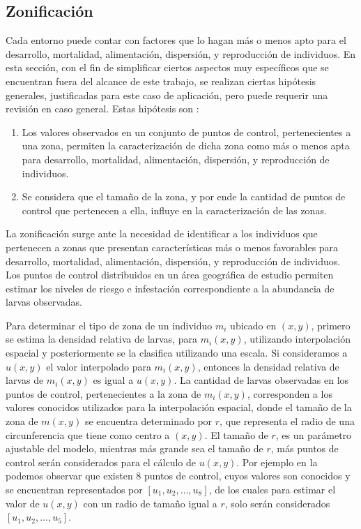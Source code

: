 \subsection{Zonificación}
\label{subsec:cap4-zonificacion}
Cada entorno puede contar con factores que lo hagan más o menos apto para el desarrollo,
mortalidad, alimentación, dispersión, y reproducción de individuos. En esta sección, con el fin de
simplificar ciertos aspectos muy específicos que se encuentran fuera del alcance de este trabajo,
se realizan ciertas hipótesis generales, justificadas para este caso de aplicación, pero puede
requerir una revisión en caso general. Estas hipótesis son :
\begin{enumerate}
    \item Los valores observados en un conjunto de puntos de control, pertenecientes a una zona, permiten la caracterización de dicha zona como más o menos apta para desarrollo, mortalidad, alimentación, dispersión, y reproducción de individuos.
    \item Se considera que el tamaño de la zona, y por ende la cantidad de puntos de control que pertenecen a ella, influye en la caracterización de las zonas.
\end{enumerate}

La zonificación surge ante la necesidad de identificar a los individuos que pertenecen a zonas que
presentan características más o menos favorables para desarrollo, mortalidad, alimentación,
dispersión, y reproducción de individuos. Los puntos de control distribuidos en un área geográfica
de estudio permiten estimar los niveles de riesgo e infestación correspondiente a la abundancia de
larvas observadas.

Para determinar el tipo de zona de un individuo $m_{i}$ ubicado en $(x, y)$, primero se estima la
densidad relativa de larvas, para $m_{i}(x, y)$, utilizando interpolación espacial y posteriormente
se la clasifica utilizando una escala. Si consideramos a $u(x, y)$ el valor interpolado para
$m_{i}(x, y)$, entonces la densidad relativa de larvas de $m_{i}(x, y)$ es igual a $u(x, y)$. La
cantidad de larvas observadas en los puntos de control, pertenecientes a la zona de $m_{i}(x, y)$,
corresponden a los valores conocidos utilizados para la interpolación espacial, donde el tamaño de
la zona de $m(x, y)$ se encuentra determinado por $r$, que representa el radio de una
circunferencia que tiene como centro a $(x, y)$. El tamaño de $r$, es un parámetro ajustable del
modelo, mientras más grande sea el tamaño de $r$, más puntos de control serán considerados para el
cálculo de $u(x, y)$. Por ejemplo en la  podemos observar que
existen 8 puntos de control, cuyos valores son conocidos y se encuentran representados por
$[u_{1}, u_{2}, \dots ,u_{8}]$, de los cuales para estimar el valor de $u(x, y)$ con un radio de
tamaño igual a $r$, solo serán considerados $[u_{1}, u_{2},\dots,u_{5}]$.

